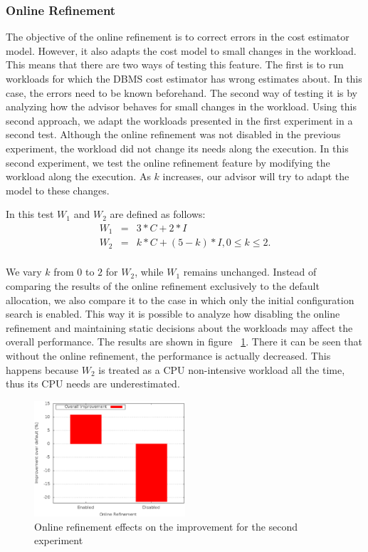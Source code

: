 \documentclass[jidm,a4paper]{jidm} %
\begin{document}
\subsubsection{Online Refinement}

The objective of the online refinement is to correct errors in the cost estimator model. However, it also adapts the cost model to small changes in the workload. This means that there are two ways of testing this feature. The first is to run workloads for which the DBMS cost estimator has wrong estimates about. In this case, the errors need to be known beforehand. The second way of testing it is by analyzing how the advisor behaves for small changes in the workload. Using this second approach, we adapt the workloads presented in the first experiment in a second test. Although the online refinement was not disabled in the previous experiment, the workload did not change its needs along the execution. In this second experiment, we test the online refinement feature by modifying the workload along the execution. As $k$ increases, our advisor will try to adapt the model to these changes.

In this test $W_{1}$ and $W_{2}$ are defined as follows:
\begin{eqnarray*}
 W_{1} &=& 3*C + 2*I \\
 W_{2} &=& k*C + (5-k)*I, 0 \leq k \leq 2. \\
\end{eqnarray*}

We vary $k$ from $0$ to $2$ for $W_{2}$, while $W_{1}$ remains unchanged. Instead of comparing the results of the online refinement exclusively to the default allocation, we also compare it to the case in which only the initial configuration search is enabled. This way it is possible to analyze how disabling the online refinement and maintaining static decisions about the workloads may affect the overall performance. The results are shown in figure ~\ref{fig:online-ref-pf}. There it can be seen that without the online refinement, the performance is actually decreased. This happens because $W_{2}$ is treated as a CPU non-intensive workload all the time, thus its CPU needs are underestimated.
\begin{figure}[t]
 \centering
 \includegraphics[width=0.5\textwidth]{online-ref.eps}
 \caption{Online refinement effects on the improvement for the second experiment}
 \label{fig:online-ref-pf}
\end{figure} 
\end{document}
